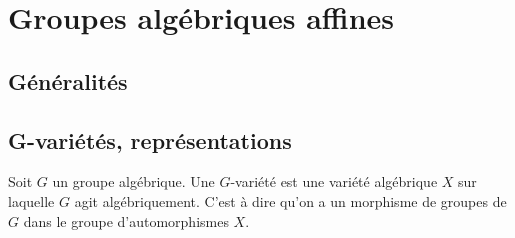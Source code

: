 \section{Groupes algébriques affines}
\subsection{Généralités}
\subsection{G-variétés, représentations}

\begin{defn}[G-variété]
Soit $G$ un groupe algébrique. Une $G$-variété est une variété algébrique $X$ sur laquelle $G$ agit algébriquement. C'est à dire qu'on a un morphisme de groupes de $G$ dans le groupe d'automorphismes $X$.
\end{defn}

